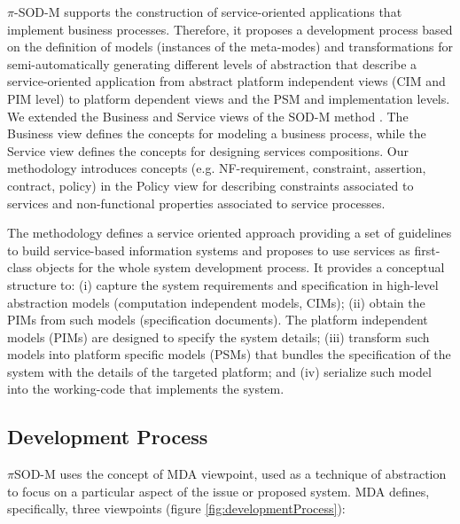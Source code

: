 \documentclass[conference]{IEEEtran}
\begin{document}
$\pi$-SOD-M supports the construction of service-oriented applications that implement business processes.
Therefore, it proposes a development process based on the definition of models
(instances of the meta-modes) and transformations for semi-automatically
generating different levels of abstraction that describe a service-oriented
application from abstract platform independent views (CIM and PIM level) to
platform dependent views and the PSM and implementation levels. We extended the
Business and Service views of the SOD-M method \cite{CastroMV11}. The Business
view defines  the concepts for modeling a business process, while the Service
view defines the concepts  for designing services compositions. Our methodology
introduces concepts (e.g. NF-requirement, constraint, assertion, contract,
policy) in the Policy view for describing constraints associated to services and
non-functional properties associated to service processes.

The methodology defines a service oriented approach providing a set of
guidelines to build service-based information systems and proposes to use services as
first-class objects for the whole system development process. It
provides a conceptual structure to: (i) capture the system requirements and specification in
high-level abstraction models (computation independent models, CIMs); (ii)
obtain the PIMs from such models (specification documents). The
platform independent models (PIMs) are designed to specify the system
details; (iii) transform such models into platform specific models
(PSMs) that bundles the specification of the system with the details of the
targeted platform; and (iv) serialize such model into the working-code that implements the system.
 
 \subsection{Development Process}


$\pi$SOD-M uses the concept of MDA viewpoint, used as a technique of
abstraction to focus on a particular aspect of the issue or proposed system.
MDA defines, specifically, three viewpoints (figure
\ref{fig:developmentProcess}):
\end{document}
